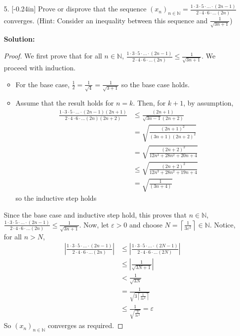 \documentclass[letterpaper,12pt]{article}
\theoremstyle{definition}
\begin{document}
\begin{enumerate}
    \item[5.] \reversemarginpar{}[-0.24in] Prove or disprove that the sequence $(x_n)_{n \in \mathbb{N}} = \frac{1\cdot 3 \cdot 5 \cdot \ldots \cdot (2n-1)}{2 \cdot 4 \cdot 6 \cdot \ldots (2n)}$ converges. (Hint: Consider an inequality between this sequence and $\frac{1}{\sqrt{3n+1}}$)
\begin{mdframed}
\textbf{Solution:}
    \begin{proof}
        We first prove that for all $n \in \mathbb{N}$, $\frac{1\cdot 3 \cdot 5 \cdot \ldots \cdot (2n-1)}{2 \cdot 4 \cdot 6 \cdot \ldots (2n)} \leq \frac{1}{\sqrt{3n+1}}$. We proceed with induction. \begin{itemize}
            \item For the base case, $\frac{1}{2} = \frac{1}{\sqrt{4}} =\frac{1}{\sqrt{3+ 1}}$ so the base case holds.
            \item Assume that the result holds for $n = k$. Then, for $k+1$, by assumption,
            \begin{align*}
              \frac{1\cdot 3 \cdot 5 \cdot \ldots \cdot (2n-1)(2n+1)}{2 \cdot 4 \cdot 6 \cdot \ldots (2n)(2n+2)}  &\leq \frac{(2n+1)}{\sqrt{3n-1}(2n+2)} \\
              &= \sqrt{\frac{(2n+1)^2}{(3n+1)(2n+2)^2}} \\
              &=  \sqrt{\frac{(2n+2)^2}{12n^3+28n^2+20n+4}} \\
              &\leq \sqrt{\frac{(2n+2)^2}{12n^3+28n^2+19n+4}} \\
              &= \sqrt{\frac{1}{(3n+4)}}
            \end{align*}
            so the inductive step holds
        \end{itemize}
        Since the base case and inductive step hold, this proves that $n \in \mathbb{N}$, $\frac{1\cdot 3 \cdot 5 \cdot \ldots \cdot (2n-1)}{2 \cdot 4 \cdot 6 \cdot \ldots (2n)} \leq \frac{1}{\sqrt{3n+1}}$. Now, let $\varepsilon > 0$ and choose $N = \left \lceil\frac{ 1  }{3\varepsilon^2}\right \rceil \in \mathbb{N}$. Notice, for all $n > N$, \begin{align*}
             \left | \frac{1\cdot 3 \cdot 5 \cdot \ldots \cdot (2n-1)}{2 \cdot 4 \cdot 6 \cdot \ldots (2n)}\right | &\leq   \left |\frac{1\cdot 3 \cdot 5 \cdot \ldots \cdot (2N-1)}{2 \cdot 4 \cdot 6 \cdot \ldots (2N)} \right| \\
             &\leq \left | \frac{1}{\sqrt{3N+1}} \right | \\
             &<  \frac{1}{\sqrt{3N}} \\
              &= \frac{1}{\sqrt{3\left \lceil\frac{ 1 }{3\varepsilon^2}\right \rceil }} \\
              &\leq \frac{1}{\sqrt{ \frac{ 3  }{3\varepsilon^2} }} = \varepsilon
        \end{align*}
        So $(x_n)_{n\in \mathbb{N}}$ converges as required.
    \end{proof}
    \end{mdframed}
\end{enumerate}
\end{document}
